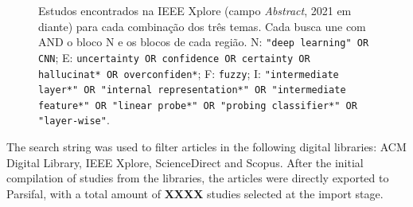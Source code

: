\begin{figure}[t]
\centering
{}
\caption{Estudos encontrados na IEEE Xplore (campo \textit{Abstract}, 2021 em diante) para cada combinação dos três temas. Cada busca une com AND o
bloco N e os blocos de cada região. N: \texttt{"deep learning" OR CNN}; E: \texttt{uncertainty
OR confidence OR certainty OR hallucinat* OR overconfiden*}; F: \texttt{fuzzy}; I: \texttt{"intermediate layer*" OR "internal
representation*" OR "intermediate feature*" OR "linear probe*" OR "probing classifier*" OR "layer-wise"}.}
\label{fig:venn}
\end{figure}

The search string was used to filter articles in the following digital libraries: ACM Digital Library, IEEE Xplore, ScienceDirect and
Scopus. After the initial compilation of studies from the libraries, the articles were directly exported to Parsifal, with a total amount
of \textbf{XXXX} studies selected at the import stage.

